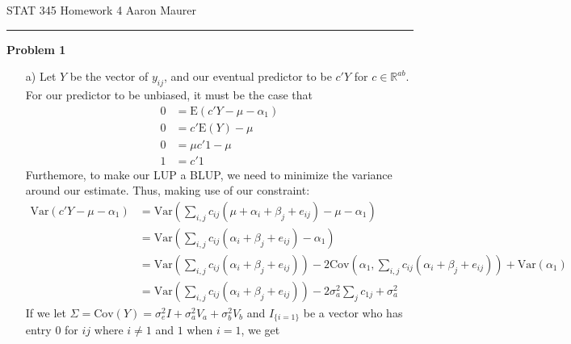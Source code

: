 \documentclass[11pt]{article}
\newcommand{\R}{\mathbb{R}}
\newcommand{\E}{\mathrm{E}}
\newcommand{\var}{\mathrm{Var}}
\newcommand{\cov}{\mathrm{Cov}}
\theoremstyle{definition}
\begin{document}

STAT 345 Homework 4 \hfill Aaron Maurer
\vspace{2mm}
\hrule
\vspace{2mm}
{\bf Problem 1}
\begin{itemize}
    \item[a)]
        Let $Y$ be the vector of $y_{ij}$, and our eventual predictor to be $c'Y$ for $c\in\R^{ab}$. For our predictor to be unbiased, it must be the case that
        \begin{align*}
            0 &= \E(c'Y-\mu-\alpha_1) \\
            0 &= c'\E(Y) - \mu \\
            0 &= \mu c'1 - \mu \\
            1 &= c'1
        \end{align*}
        Furthemore, to make our LUP a BLUP, we need to minimize the variance around our estimate. Thus, making use of our constraint:
        \begin{align*}
            \var(c'Y-\mu-\alpha_1) &= \var\left(\sum_{i,j} c_{ij}(\mu + \alpha_i + \beta_j + e_{ij}) - \mu - \alpha_1\right) \\
                                   &= \var\left(\sum_{i,j} c_{ij}(      \alpha_i + \beta_j + e_{ij}) -     \alpha_1\right) \\
                                   &= \var\left(\sum_{i,j} c_{ij}(\alpha_i + \beta_j + e_{ij})\right) -2\cov\left(\alpha_1,\sum_{i,j} c_{ij}(\alpha_i + \beta_j + e_{ij})\right) + \var(\alpha_1)  \\
                                   &= \var\left(\sum_{i,j} c_{ij}(\alpha_i + \beta_j + e_{ij})\right) -2 \sigma_a^2 \sum_{j} c_{1j} + \sigma_a^2 
        \end{align*}
        If we let \(\Sigma=\cov(Y)=\sigma_e^2I + \sigma_a^2 V_a + \sigma_b^2 V_b\)  and \(I_{\{i=1\}}\) be a vector who has entry $0$ for $ij$ where $i\neq1$ and $1$ when $i=1$, we get


\end{itemize}
\end{document}
